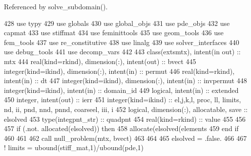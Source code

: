 Referenced by solve\+\_\+subdomain().


\begin{DoxyCode}
428       \textcolor{keywordtype}{use }typy
429       \textcolor{keywordtype}{use }globals
430       \textcolor{keywordtype}{use }global_objs
431       \textcolor{keywordtype}{use }pde_objs
432       \textcolor{keywordtype}{use }capmat
433       \textcolor{keywordtype}{use }stiffmat
434       \textcolor{keywordtype}{use }feminittools
435       \textcolor{keywordtype}{use }geom_tools
436       \textcolor{keywordtype}{use }fem_tools
437       \textcolor{keywordtype}{use }re_constitutive
438       \textcolor{keywordtype}{use }linalg
439       \textcolor{keywordtype}{use }solver_interfaces
440       \textcolor{keywordtype}{use }debug_tools     
441       \textcolor{keywordtype}{use }decomp_vars
442       
443       \textcolor{keywordtype}{class}(extsmtx), \textcolor{keywordtype}{intent(in out)} :: mtx
444       \textcolor{keywordtype}{real(kind=rkind)}, \textcolor{keywordtype}{dimension(:)}, \textcolor{keywordtype}{intent(out)} :: bvect
445       \textcolor{keywordtype}{integer(kind=ikind)}, \textcolor{keywordtype}{dimension(:)}, \textcolor{keywordtype}{intent(in)} :: permut
446       \textcolor{keywordtype}{real(kind=rkind)}, \textcolor{keywordtype}{intent(in)} :: dt
447       \textcolor{keywordtype}{integer(kind=ikind)}, \textcolor{keywordtype}{dimension(:)}, \textcolor{keywordtype}{intent(in)} :: invpermut
448       \textcolor{keywordtype}{integer(kind=ikind)}, \textcolor{keywordtype}{intent(in)} :: domain\_id
449       \textcolor{keywordtype}{logical}, \textcolor{keywordtype}{intent(in)} :: extended
450       \textcolor{keywordtype}{integer}, \textcolor{keywordtype}{intent(out)} :: ierr
451       \textcolor{keywordtype}{integer(kind=ikind)} :: el,j,k,l, proc, ll, limits, nd, ii, pnd, nnd\textcolor{comment}{, pnnd, coarseel, iii, i}
452 \textcolor{comment}{      }\textcolor{keywordtype}{logical}, \textcolor{keywordtype}{dimension(:)}, \textcolor{keywordtype}{allocatable}, \textcolor{keywordtype}{save} :: elsolved
453       \textcolor{keywordtype}{type}(integpnt_str) :: quadpnt
454       \textcolor{keywordtype}{real(kind=rkind)} :: value
455 
456       
457       \textcolor{keywordflow}{if} (.not. \textcolor{keyword}{allocated}(elsolved)) \textcolor{keywordflow}{then}
458         \textcolor{keyword}{allocate}(elsolved(elements%
459 \textcolor{keywordflow}{      end if}
460       
461       
462       \textcolor{keyword}{call }null_problem(mtx, bvect)
463 
464       
465       elsolved = .false. 
466       
467 \textcolor{comment}{!       limits = ubound(stiff\_mat,1)/ubound(pde,1)}

\end{DoxyCode}

